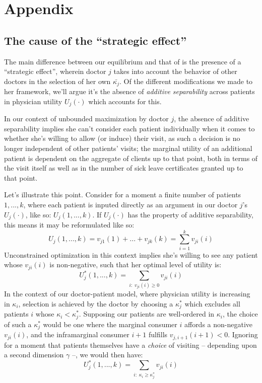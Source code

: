 \documentclass[../main.tex]{subfiles}
\begin{document}
\section*{Appendix}  %
\renewcommand{\thesubsection}{A.\arabic{subsection}}  
\renewcommand{\thesection}{A}  %
\renewcommand{\thetheorem}{\thesection.\arabic{theorem}}  %

\subsection{The cause of the ``strategic effect''}
\label{sec:separate}

The main difference between our equilibrium and that of \cite{schnell2017physician} is the presence of a ``strategic effect'', wherein doctor $j$ takes into account the behavior of other doctors in the selection of her own $\bar{\kappa_j}$. Of the different modifications we made to her framework, we'll argue it's the absence of \textit{additive separability} across patients in physician utility $U_j(\cdot)$ which accounts for this.

In our context of unbounded maximization by doctor $j$, the absence of additive separability implies she can't consider each patient individually when it comes to whether she's willing to allow (or induce) their visit, as such a decision is no longer independent of other patients' visits; the marginal utility of an additional patient is dependent on the aggregate of clients up to that point, both in terms of the visit itself as well as in the number of sick leave certificates granted up to that point.

Let's illustrate this point. Consider for a moment a finite number of patients $1, ... , k$, where each patient is inputed directly as an argument in our doctor $j$’s $U_j(\cdot)$, like so: $U_j(1, ..., k)$. If $U_j(\cdot)$ has the property of additive separability, this means it may be reformulated like so:
\[
U_j(1, ...,k) = v_{j1}(1) + ... + v_{jk}(k) = \sum_{i = 1}^{k} v_{ji}(i)
\]
Unconstrained optimization in this context implies she’s willing to see any patient whose $v_{ji}(i)$ is non-negative, such that her optimal level of utility is:
\[
U_j^*(1, ...,k) =  \sum_{i : \; v_{ji}(i) \geq 0} v_{ji}(i)
\]
In the context of our doctor-patient model, where physician utility is increasing in $\kappa_i$, selection is achieved by the doctor by choosing a $\kappa_j^*$ which excludes all patients $i$ whose $\kappa_i < \kappa_j^*$. Supposing our patients are well-ordered in $\kappa_i$, the choice of such a $\kappa_j^*$ would be one where the marginal consumer $i$ affords a non-negative $v_{ji}(i)$, and the inframarginal consumer $i + 1$ fulfills $v_{j,i+1}(i+1) < 0$. Ignoring for a moment that patients themselves have a \textit{choice} of visiting -- depending upon a second dimension $\gamma$ --, we would then have:
\[
U_j^*(1, ...,k) =  \sum_{i : \; \kappa_i \geq \kappa_j^*} v_{ji}(i)
\]
\end{document}
